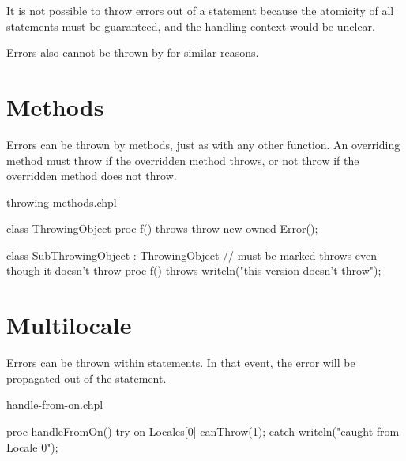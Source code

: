 It is not possible to throw errors out of a  statement because the
atomicity of all  statements must be guaranteed, and the handling
context would be unclear.

Errors also cannot be thrown by  for similar reasons.

\section{Methods}
\label{Errors_Methods}

Errors can be thrown by methods, just as with any other function.
An overriding method must throw if the overridden method throws,
or not throw if the overridden method does not throw.

\begin{chapelexample}{throwing-methods.chpl}
\begin{chapel}
class ThrowingObject {
  proc f() throws {
    throw new owned Error();
  }
}

class SubThrowingObject : ThrowingObject {
  // must be marked throws even though it doesn't throw
  proc f() throws {
    writeln("this version doesn't throw");
  }
}
\end{chapel}
\begin{chapelpost}
\end{chapelpost}
\begin{chapeloutput}
\end{chapeloutput}
\end{chapelexample}

\section{Multilocale}
\label{Errors_Multilocale}

Errors can be thrown within  statements. In that event, the error
will be propagated out of the  statement.

\begin{chapelexample}{handle-from-on.chpl}
\begin{chapel}
proc handleFromOn() {
  try {
    on Locales[0] {
      canThrow(1);
    }
  } catch {
    writeln("caught from Locale 0");
  }
}
\end{chapel}
\begin{chapelpost}
\end{chapelpost}
\begin{chapeloutput}
\end{chapeloutput}
\end{chapelexample}

